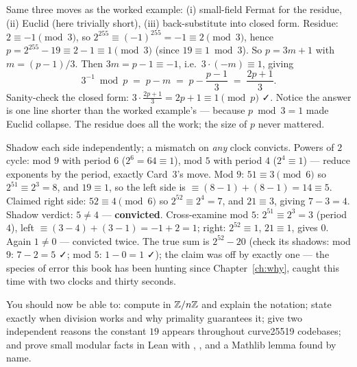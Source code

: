 \pathway Same three moves as the worked example: (i) small-field Fermat
for the residue, (ii) Euclid (here trivially short), (iii)
back-substitute into closed form.
\answer Residue: $2 \equiv -1 \pmod 3$, so
$2^{255} \equiv (-1)^{255} = -1 \equiv 2 \pmod 3$, hence
$p = 2^{255} - 19 \equiv 2 - 1 \equiv 1 \pmod 3$ (since
$19 \equiv 1 \bmod 3$). So $p = 3m + 1$ with $m = (p-1)/3$. Then
$3m = p - 1 \equiv -1$, i.e.\ $3 \cdot (-m) \equiv 1$, giving
\[
3^{-1} \bmod p \;=\; p - m \;=\; p - \frac{p-1}{3} \;=\; \frac{2p + 1}{3}.
\]
Sanity-check the closed form: $3 \cdot \frac{2p+1}{3} = 2p + 1 \equiv 1
\pmod p$ ✓. Notice the answer is one line shorter than the worked
example's --- because $p \bmod 3 = 1$ made Euclid collapse. The residue
does all the work; the size of $p$ never mattered.

\pathway Shadow each side independently; a mismatch on \emph{any} clock
convicts. Powers of $2$ cycle: mod $9$ with period $6$
($2^6 = 64 \equiv 1$), mod $5$ with period $4$ ($2^4 \equiv 1$) ---
reduce exponents by the period, exactly Card~3's move.
\answer Mod $9$: $51 \equiv 3 \pmod 6$ so $2^{51} \equiv 2^3 = 8$, and
$19 \equiv 1$, so the left side is
$\equiv (8 - 1) + (8 - 1) = 14 \equiv 5$.
Claimed right side: $52 \equiv 4 \pmod 6$ so $2^{52} \equiv 2^4 = 7$,
and $21 \equiv 3$, giving $7 - 3 = 4$. Shadow verdict: $5 \neq 4$ ---
\textbf{convicted}. Cross-examine mod $5$: $2^{51} \equiv 2^{3} = 3$
(period $4$), left $\equiv (3 - 4) + (3 - 1) = -1 + 2 = 1$; right:
$2^{52} \equiv 1$, $21 \equiv 1$, gives $0$. Again $1 \neq 0$ ---
convicted twice. The true sum is $2^{52} - 20$ (check its shadows:
mod $9$: $7 - 2 = 5$ ✓; mod $5$: $1 - 0 = 1$ ✓); the claim was off by
exactly one --- the species of error this book has been hunting since
Chapter~\ref{ch:why}, caught this time with two clocks and thirty
seconds.

\begin{checkpoint}
You should now be able to: compute in $\mathbb{Z}/n\mathbb{Z}$ and explain the notation;
state exactly when division works and why primality guarantees it; give two
independent reasons the constant $19$ appears throughout curve25519
codebases; and prove small modular facts in Lean with ,
, and a Mathlib lemma found by name.
\end{checkpoint}
